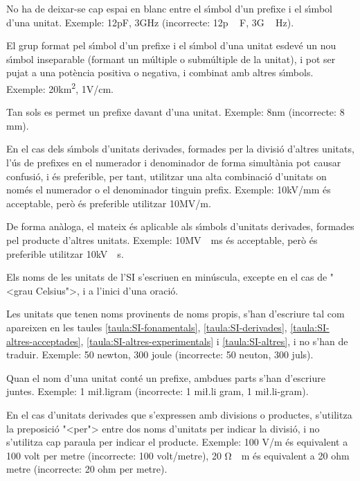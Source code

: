 No ha de deixar-se cap espai en blanc entre el s\'{\i}mbol d'un prefixe i
el s\'{\i}mbol d'una unitat. Exemple: 12\unit{pF}, 3\unit{GHz}
(incorrecte: 12\unit{p\,F}, 3\unit{G\,Hz}).

El grup format pel s\'{\i}mbol d'un prefixe i el s\'{\i}mbol d'una unitat
esdev\'{e} un nou s\'{\i}mbol inseparable (formant un m\'{u}ltiple o subm\'{u}ltiple
de la unitat), i pot ser pujat a una pot\`{e}ncia positiva o negativa, i
combinat amb altres s\'{\i}mbols. Exemple: 20\unit{km^2}, 1\unit{V/cm}.

Tan sols es permet un prefixe davant d'una unitat. Exemple:
8\unit{nm} (incorrecte: 8 m\micro m).

En el cas dels s\'{\i}mbols d'unitats derivades, formades per la divisi\'{o}
d'altres unitats, l'\'{u}s de prefixes en el numerador i denominador de
forma simult\`{a}nia pot causar confusi\'{o}, i \'{e}s preferible, per tant,
utilitzar una alta combinaci\'{o} d'unitats on nom\'{e}s el numerador o el
denominador tinguin prefix. Exemple: 10\unit{kV/mm} \'{e}s acceptable,
per\`{o} \'{e}s preferible utilitzar 10\unit{MV/m}.

De forma an\`{a}loga, el mateix \'{e}s aplicable als s\'{\i}mbols d'unitats
derivades, formades pel producte d'altres unitats.  Exemple:
10\unit{MV\cdot ms} \'{e}s acceptable, per\`{o} \'{e}s preferible utilitzar
10\unit{kV\cdot s}.

Els noms de les unitats de l'SI s'escriuen en min\'{u}scula, excepte en
el cas de {"<}grau Celsius{">}, i a l'inici d'una oraci\'{o}.

Les unitats que tenen noms provinents de noms propis, s'han
d'escriure tal com apareixen en les taules
\vref{taula:SI-fonamentals}, \vref{taula:SI-derivades}, \vref{taula:SI-altres-acceptades}, \vref{taula:SI-altres-experimentals} i \vref{taula:SI-altres}, i no s'han
de traduir. Exemple: 50 newton, 300 joule (incorrecte: 50 neuton,
300 juls).


 Quan el nom d'una unitat
cont\'{e} un prefixe, ambdues parts s'han d'escriure juntes. Exemple: 1
mi{\l.l}igram (incorrecte: 1 mi{\l.l}i gram, 1 mi{\l.l}i-gram).

En el cas  d'unitats derivades que s'expressen amb divisions o
productes, s'utilitza la preposici\'{o} {"<}per{">} entre dos noms d'unitats
per indicar la divisi\'{o}, i no s'utilitza cap paraula per indicar el
producte. Exemple: 100 \unit{V/m} \'{e}s equivalent a 100 volt per metre
(incorrecte:
 100 volt/metre), 20 \unit{\ohm\cdot m} \'{e}s equivalent a 20 ohm metre
(incorrecte: 20 ohm per metre).

